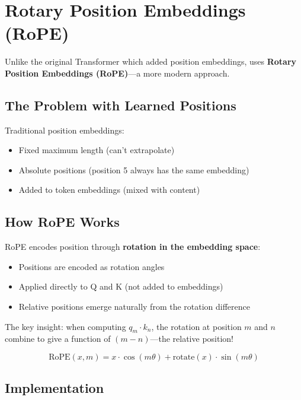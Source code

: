 \section{Rotary Position Embeddings (RoPE)}

Unlike the original Transformer which added position embeddings, \TryLM uses \textbf{Rotary Position Embeddings (RoPE)}---a more modern approach.

\subsection{The Problem with Learned Positions}

Traditional position embeddings:
\begin{itemize}
    \item Fixed maximum length (can't extrapolate)
    \item Absolute positions (position 5 always has the same embedding)
    \item Added to token embeddings (mixed with content)
\end{itemize}

\subsection{How RoPE Works}

RoPE encodes position through \textbf{rotation in the embedding space}:
\begin{itemize}
    \item Positions are encoded as rotation angles
    \item Applied directly to Q and K (not added to embeddings)
    \item Relative positions emerge naturally from the rotation difference
\end{itemize}

The key insight: when computing $q_m \cdot k_n$, the rotation at position $m$ and $n$ combine to give a function of $(m - n)$---the relative position!

\begin{equation}
\text{RoPE}(x, m) = x \cdot \cos(m\theta) + \text{rotate}(x) \cdot \sin(m\theta)
\end{equation}

\subsection{Implementation}

